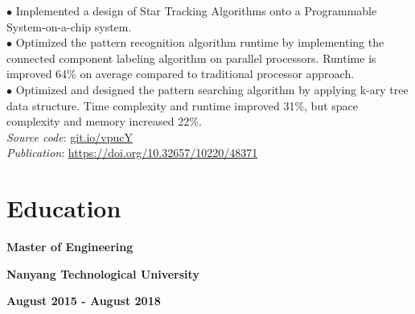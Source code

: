 \documentclass[10pt]{article}
\begin{document}
        \vspace{-5mm}

        $\bullet$ {Implemented a design of Star Tracking Algorithms onto a Programmable System-on-a-chip system. } \\
        $\bullet$ {Optimized the pattern recognition algorithm runtime by implementing the connected component labeling algorithm on parallel processors. Runtime is improved 64\% on average compared to traditional processor approach.} \\
        $\bullet$ {Optimized and designed the pattern searching algorithm by applying k-ary tree data structure. Time complexity and runtime improved 31\%, but space complexity and memory increased 22\%.} \\
        \emph{Source code}: \href{https://git.io/vpucY}{git.io/vpucY} \\
        \emph{Publication}: \href{https://doi.org/10.32657/10220/48371}{https://doi.org/10.32657/10220/48371}


    \vspace{2mm}
    \section{Education}

        \begin{multicols}{3}
            \begin{flushleft}
                \textbf{Master of Engineering}
            \end{flushleft}

            \columnbreak

            \begin{center}
                \textbf{Nanyang Technological University}
            \end{center}

            \columnbreak

            \begin{flushright}
                \textbf{August 2015 - August 2018}
            \end{flushright}
        \end{multicols}

        \vspace{-5mm}
\end{document}
